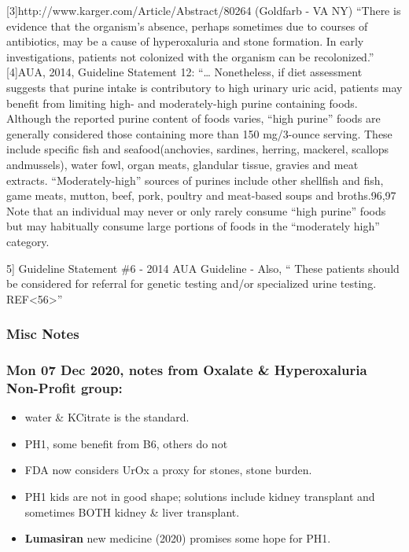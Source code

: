 {[}3{]}http://www.karger.com/Article/Abstract/80264 (Goldfarb - VA NY)
``There is evidence that the organism's absence, perhaps sometimes due
to courses of antibiotics, may be a cause of hyperoxaluria and stone
formation. In early investigations, patients not colonized with the
organism can be recolonized.'' {[}4{]}AUA, 2014, Guideline Statement 12:
``\ldots{} Nonetheless, if diet assessment suggests that purine intake
is contributory to high urinary uric acid, patients may benefit from
limiting high- and moderately-high purine containing foods. Although the
reported purine content of foods varies, ``high purine'' foods are
generally considered those containing more than 150 mg/3-ounce serving.
These include specific fish and seafood(anchovies, sardines, herring,
mackerel, scallops andmussels), water fowl, organ meats, glandular
tissue, gravies and meat extracts. ``Moderately-high'' sources of
purines include other shellfish and fish, game meats, mutton, beef,
pork, poultry and meat-based soups and broths.96,97 Note that an
individual may never or only rarely consume ``high purine'' foods but
may habitually consume large portions of foods in the ``moderately
high'' category.

5{]} Guideline Statement \#6 - 2014 AUA Guideline - Also, `` These
patients should be considered for referral for genetic testing and/or
specialized urine testing. REF\textless56\textgreater''

\hypertarget{misc-notes}{%
\subsubsection{Misc Notes}\label{misc-notes}}

\hypertarget{mon-07-dec-2020-notes-from-oxalate-hyperoxaluria-non-profit-group}{%
\subsubsection{Mon 07 Dec 2020, notes from Oxalate \& Hyperoxaluria
Non-Profit
group:}\label{mon-07-dec-2020-notes-from-oxalate-hyperoxaluria-non-profit-group}}

\begin{itemize}
\tightlist
\item
  water \& KCitrate is the standard.
\item
  PH1, some benefit from B6, others do not
\item
  FDA now considers UrOx a proxy for stones, stone burden.
\item
  PH1 kids are not in good shape; solutions include kidney transplant
  and sometimes BOTH kidney \& liver transplant.
\item
  \textbf{Lumasiran} new medicine (2020) promises some hope for PH1.
\end{itemize}
